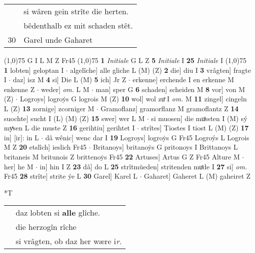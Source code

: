 \documentclass[8pt,a4paper,notitlepage]{article}
\begin{document}
\begin{table}[ht]
\begin{minipage}[t]{0.5\linewidth}
\begin{tabular}{rl}
 & si wâren gein strîte die herten.\\ 
 & bêdenthalb ez mit schaden stêt.\\ 
30 & Garel unde Gaharet\\ 
\end{tabular}
\scriptsize
\line(1,0){75} \newline
G I L M Z Fr45 \newline
\line(1,0){75} \newline
\textbf{1} \textit{Initiale} G L Z  \textbf{5} \textit{Initiale} I  \textbf{25} \textit{Initiale} I  \newline
\line(1,0){75} \newline
\textbf{1} lobten] geloptan I  $\cdot$ algelîche] alle gliche L (M) (Z) \textbf{2} die] diu I \textbf{3} vrâgten] fragte I  $\cdot$ daz] isz M \textbf{4} si] Die L (M) \textbf{5} ich] Jr Z  $\cdot$ erkenne] erchende I en erkenne M enkenne Z  $\cdot$ weder] \textit{om.} L M  $\cdot$ man] sper G \textbf{6} schaden] scheiden M \textbf{8} vor] von M (Z)  $\cdot$ Logroys] logroẏs G logrois M (Z) \textbf{10} wol] wol zuͤ I \textit{om.} M \textbf{11} zingel] cingeln L (Z) \textbf{13} zornige] zcorniger M  $\cdot$ Gramoflanz] gramorflanz M gramoflantz Z \textbf{14} suochte] sucht I (L) (M) (Z) \textbf{15} swer] wer L M  $\cdot$ si muosen] die muͦssten I (M) sý myͯsen L die muste Z \textbf{16} gerihtiu] gerihtet I  $\cdot$ strîtes] Tiostes I tiost L (M) (Z) \textbf{17} in] [ir]: in L  $\cdot$ dâ wênic] wenc dar I \textbf{19} Logroys] logroẏs G Fr45 Logroýs L Logrois M Z \textbf{20} etslîch] ieslich Fr45  $\cdot$ Britanoys] britanoẏs G pritonoys I Brittanoys L britaneis M britunois Z brittenoẏs Fr45 \textbf{22} Artuses] Artus G Z Fr45 Alture M  $\cdot$ her] he M  $\cdot$ in] hin I Z \textbf{23} dâ] do L \textbf{25} strîtmüeden] stritenden muͤde I \textbf{27} si] \textit{om.} Fr45 \textbf{28} strîte] strite ýe L \textbf{30} Garel] Karel L  $\cdot$ Gaharet] Gaheret L (M) gaheiret Z \newline
\end{minipage}
\hspace{0.5cm}
\begin{minipage}[t]{0.5\linewidth}
\small
\begin{center}*T
\end{center}
\begin{tabular}{rl}
 & daz lobten si \textbf{alle} glîche.\\ 
 & die herzogîn rîche\\ 
 & si vrâgten, ob daz her wære i\textit{r}.\\ 

\end{tabular}
\end{minipage}
\end{table}
\end{document}
